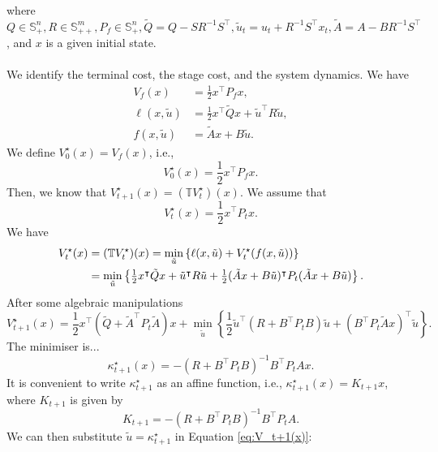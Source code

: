 \documentclass[a4paper,11pt,reqno]{amsart}
\newcommand{\tran}{\intercal}
\begin{document}
where $Q\in \mathbb{S}^n_+, R\in \mathbb{S}^m_{++}, P_f\in \mathbb{S}^n_{+}, \tilde{Q}=Q-SR^{-1}S^{\tran}, \tilde{u}_t=u_t+R^{-1}S^{\tran}x_t, \tilde{A}=A-BR^{-1}S^{\tran}$, and $x$ is a given initial state.
\\ \\
We identify the terminal cost, the stage cost, and the system dynamics. We have
\begin{align}
    V_f(x)&=\textstyle\frac{1}{2}x^{\tran}P_fx,\\
    \ell(x,\tilde{u})&=\textstyle\frac{1}{2}x^{\tran}\tilde{Q}x+\tilde{u}^{\tran}R\tilde{u},\\
    f(x,\tilde{u})&=\tilde{A}x+B\tilde{u}.
\end{align}
We define $V_{0}^{\star}(x)=V_f(x)$, i.e.,
\begin{equation}
    V_{0}^{\star}(x)=\textstyle\frac{1}{2}x^{\tran}P_fx.
\end{equation}
Then, we know that $V_{t+1}^{\star}(x)=(\mathbb{T}V_t^{\star})(x)$. We assume that
\begin{equation}
    V_t^{\star}(x)=\textstyle\frac{1}{2}x^{\tran}P_tx.
\end{equation}
We have
\begin{align} 
    V_t^{\star}(x)&=(\mathbb{T}V_t^{\star})(x)=\min_{\tilde{u}}\left\{\ell(x,\tilde{u})+V_t^{\star}(f(x,\tilde{u}))\right\} \notag\\
    &=\min_{\tilde{u}}\left\{\textstyle\frac{1}{2}x^{\tran}\tilde{Q}x+\tilde{u}^{\tran}R\tilde{u}+\frac{1}{2}(\tilde{A}x+B\tilde{u})^{\tran}P_t(\tilde{A}x+B\tilde{u})\right\}.
\end{align}
After some algebraic manipulations
\begin{equation}
    V_{t+1}^{\star}(x)=\textstyle\frac{1}{2}x^{\tran}(\tilde{Q}+\tilde{A}^{\tran}P_t\tilde{A})x+\min_{\tilde{u}}\left\{\textstyle\frac{1}{2}\tilde{u}^{\tran}(R+B^{\tran}P_tB)\tilde{u}+(B^{\tran}P_t\tilde{A}x)^{\tran}\tilde{u}\right\}.
    \label{eq:V_t+1(x)}
\end{equation}
The minimiser is...
\begin{equation}
    \kappa_{t+1}^{\star}(x)=-(R+B^{\tran}P_tB)^{-1}B^{\tran}P_tAx.
\end{equation}
It is convenient to write $\kappa^{\star}_{t+1}$ as an affine function, i.e., $\kappa_{t+1}^{\star}(x)=K_{t+1}x$, where $K_{t+1}$ is given by
\begin{equation}
    K_{t+1}=-(R+B^{\tran}P_tB)^{-1}B^{\tran}P_tA.
\end{equation}
We can then substitute $\tilde{u}=\kappa_{t+1}^{\star}$ in Equation \eqref{eq:V_t+1(x)}:
\end{document}

